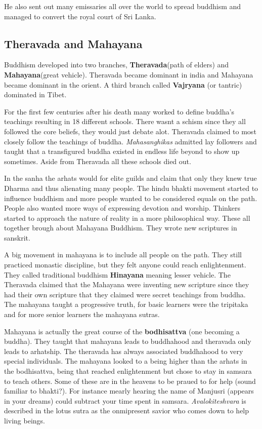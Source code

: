 \documentclass{article}
\begin{document}
He also sent out many emissaries all over the world to spread buddhism and managed to convert the royal court of Sri Lanka.

\subsection{Theravada and Mahayana}
\label{sub:theravada_and_mahayana}
Buddhism developed into two branches, \textbf{Theravada}(path of elders) and \textbf{Mahayana}(great vehicle). Theravada became dominant in india and Mahayana became dominant in the orient. A third branch called \textbf{Vajryana} (or tantric) dominated in Tibet.

For the first few centuries after his death many worked to define buddha's teachings resulting in 18 different schools. There wasnt a schism since they all followed the core beliefs, they would just debate alot. Theravada claimed to most closely follow the teachings of buddha. \emph{Mahasanghikas} admitted lay followers and taught that a transfigured buddha existed in endless life beyond to show up sometimes. Aside from Theravada all these schools died out.

In the sanha the arhats would for elite guilds and claim that only they knew true Dharma and thus alienating many people. The hindu bhakti movement started to influence buddhism and more people wanted to be considered equals on the path. People also wanted more ways of expressing devotion and worship. Thinkers started to approach the nature of reality in a more philosophical way. These all together brough about Mahayana Buddhism. They wrote new scriptures in sanskrit.

A big movement in mahayana is to include all people on the path. They still practiced monastic discipline, but they felt anyone could reach enlightenment. They called traditional buddhism \textbf{Hinayana} meaning lesser vehicle. The Theravada claimed that the Mahayana were inventing new scripture since they had their own scripture that they claimed were secret teachings from buddha. The mahayana taught a progressive truth, for basic learners were the tripitaka and for more senior learners the mahayana sutras.

Mahayana is actually the great course of the \textbf{bodhisattva} (one becoming a buddha). They taught that mahayana leads to buddhahood and theravada only leads to arhatship. The theravada has always associated buddhahood to very special individuals. The mahayana looked to a being higher than the arhats in the bodhisattva, being that reached enlightenment but chose to stay in samsara to teach others. Some of these are in the heavens to be praued to for help (sound familiar to bhakti?). For instance mearly hearing the name of Manjusri (appears in your dreams) could subtract your time spent in samsara. \emph{Avalokiteshvara} is described in the lotus sutra as the onmipresent savior who comes down to help living beings.
\end{document}
